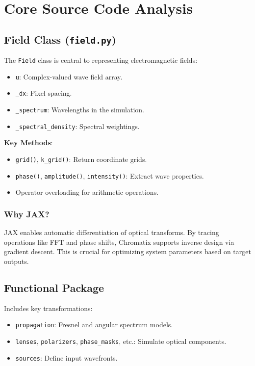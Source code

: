 \documentclass[a4paper,12pt]{report}
\begin{document}
\chapter{Core Source Code Analysis}
\section{Field Class (\texttt{field.py})}
The \texttt{Field} class is central to representing electromagnetic fields:
\begin{itemize}
    \item \texttt{u}: Complex-valued wave field array.
    \item \texttt{\_dx}: Pixel spacing.
    \item \texttt{\_spectrum}: Wavelengths in the simulation.
    \item \texttt{\_spectral\_density}: Spectral weightings.
\end{itemize}
\textbf{Key Methods}:
\begin{itemize}
    \item \texttt{grid()}, \texttt{k\_grid()}: Return coordinate grids.
    \item \texttt{phase()}, \texttt{amplitude()}, \texttt{intensity()}: Extract wave properties.
    \item Operator overloading for arithmetic operations.
\end{itemize}

\subsection{Why JAX?}
JAX enables automatic differentiation of optical transforms. By tracing operations like FFT and phase shifts, Chromatix supports inverse design via gradient descent. This is crucial for optimizing system parameters based on target outputs.

\section{Functional Package}
Includes key transformations:
\begin{itemize}
    \item \texttt{propagation}: Fresnel and angular spectrum models.
    \item \texttt{lenses}, \texttt{polarizers}, \texttt{phase\_masks}, etc.: Simulate optical components.
    \item \texttt{sources}: Define input wavefronts.
\end{itemize}
\end{document}
